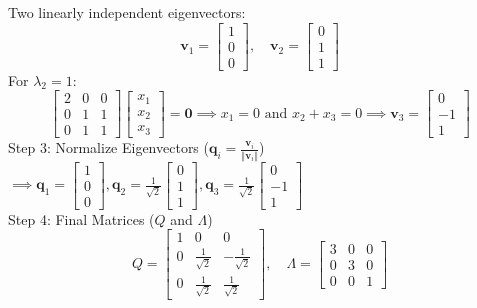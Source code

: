 \documentclass[DIV=20,oneside]{scrartcl}
\begin{document}
\begin{itemize}
	Two linearly independent eigenvectors:$$\mathbf{v}_1 = \begin{bmatrix} 1 \\ 0 \\ 0 \end{bmatrix}, \quad \mathbf{v}_2 = \begin{bmatrix} 0 \\ 1 \\ 1 \end{bmatrix}$$
	For $\lambda_2 = 1$:$$\begin{bmatrix} 2 & 0 & 0 \\ 0 & 1 & 1 \\ 0 & 1 & 1 \end{bmatrix}\begin{bmatrix} x_1 \\ x_2 \\ x_3 \end{bmatrix} = \mathbf{0} \implies x_1 = 0 \text{ and } x_2 + x_3 = 0 \implies \mathbf{v}_3 = \begin{bmatrix} 0 \\ -1 \\ 1 \end{bmatrix}$$
	Step 3: Normalize Eigenvectors ($\mathbf{q}_i = \frac{\mathbf{v}_i}{\Vert{}\mathbf{v}_i\Vert{}}$) 
	$\implies \mathbf{q}_1 = \begin{bmatrix} 1 \\ 0 \\ 0 \end{bmatrix}, \mathbf{q}_2 = \frac{1}{\sqrt{2}}\begin{bmatrix} 0 \\ 1 \\ 1 \end{bmatrix}, \mathbf{q}_3 = \frac{1}{\sqrt{2}}\begin{bmatrix} 0 \\ -1 \\ 1 \end{bmatrix}$ \\
	Step 4: Final Matrices ($Q$ and $\Lambda$)$$Q = \begin{bmatrix} 1 & 0 & 0 \\ 0 & \frac{1}{\sqrt{2}} & -\frac{1}{\sqrt{2}} \\ 0 & \frac{1}{\sqrt{2}} & \frac{1}{\sqrt{2}} \end{bmatrix}, \quad \Lambda = \begin{bmatrix} 3 & 0 & 0 \\ 0 & 3 & 0 \\ 0 & 0 & 1 \end{bmatrix}$$
	

\end{itemize}
\end{document}

